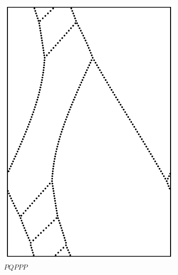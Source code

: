 \documentclass[12pt,twoside]{reedthesis}
\theoremstyle{definition}
\begin{document}
\begin{figure}[b!]
\begin{subfigure}[t]{0.24\textwidth}
    \includegraphics[width=\textwidth]{figures/string_cheese_appendix/pqppp.pdf}
    \caption*{$PQPPP$}
    \vspace{5mm}
  \end{subfigure}
  \begin{subfigure}[t]{0.24\textwidth}

\end{subfigure}
\end{figure}
\end{document}
